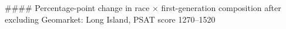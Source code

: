 #### Percentage-point change in race × first-generation composition after excluding Geomarket: Long Island, PSAT score 1270–1520
